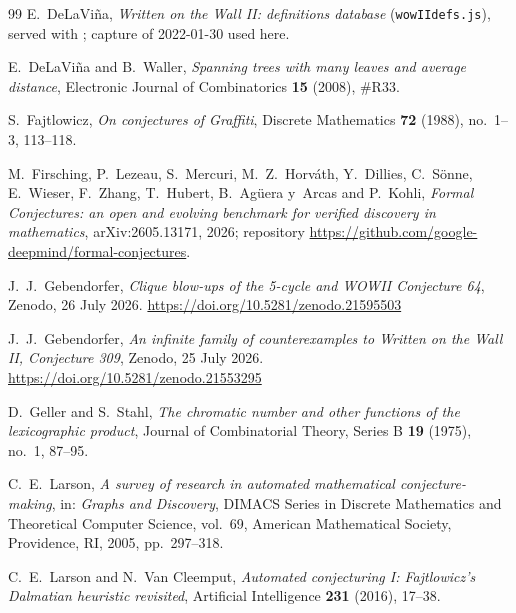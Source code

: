 \documentclass[10pt,a4paper]{article}
\theoremstyle{plain}
\theoremstyle{definition}
\begin{document}
\begin{thebibliography}{99}
E.~DeLaVi\~na,
\emph{Written on the Wall II: definitions database} (\texttt{wowIIdefs.js}),
served with \cite{wowii}; capture of 2022-01-30 used here.

E.~DeLaVi\~na and B.~Waller,
\emph{Spanning trees with many leaves and average distance},
Electronic Journal of Combinatorics \textbf{15} (2008), \#R33.

S.~Fajtlowicz,
\emph{On conjectures of Graffiti},
Discrete Mathematics \textbf{72} (1988), no.~1--3, 113--118.

M.~Firsching, P.~Lezeau, S.~Mercuri, M.~Z.~Horv\'ath, Y.~Dillies, C.~S\"onne, E.~Wieser,
F.~Zhang, T.~Hubert, B.~Ag\"uera y~Arcas and P.~Kohli,
\emph{Formal Conjectures: an open and evolving benchmark for verified discovery in mathematics},
arXiv:2605.13171, 2026;
repository \url{https://github.com/google-deepmind/formal-conjectures}.

J.~J.~Gebendorfer,
\emph{Clique blow-ups of the 5-cycle and WOWII Conjecture 64},
Zenodo, 26 July 2026. \url{https://doi.org/10.5281/zenodo.21595503}

J.~J.~Gebendorfer,
\emph{An infinite family of counterexamples to Written on the Wall II, Conjecture 309},
Zenodo, 25 July 2026. \url{https://doi.org/10.5281/zenodo.21553295}

D.~Geller and S.~Stahl,
\emph{The chromatic number and other functions of the lexicographic product},
Journal of Combinatorial Theory, Series B \textbf{19} (1975), no.~1, 87--95.

C.~E.~Larson,
\emph{A survey of research in automated mathematical conjecture-making},
in: \emph{Graphs and Discovery}, DIMACS Series in Discrete Mathematics and Theoretical
Computer Science, vol.~69, American Mathematical Society, Providence, RI, 2005, pp.~297--318.

C.~E.~Larson and N.~Van Cleemput,
\emph{Automated conjecturing I: Fajtlowicz's Dalmatian heuristic revisited},
Artificial Intelligence \textbf{231} (2016), 17--38.

\end{thebibliography}
\end{document}
